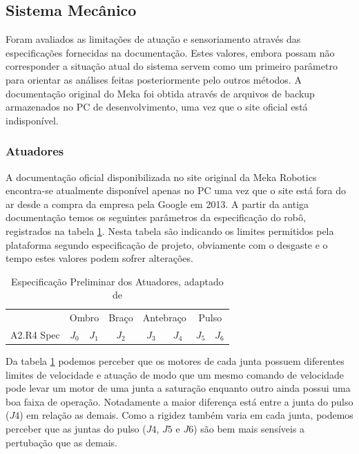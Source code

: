 \subsection{Sistema Mecânico}

Foram avaliados as limitações de atuação e sensoriamento através das especificações fornecidas na documentação. Estes valores, embora possam não corresponder a situação atual do sistema servem como um primeiro parâmetro para orientar as análises feitas posteriormente pelo outros métodos. A documentação original do Meka foi obtida através de arquivos de backup armazenados no PC de desenvolvimento, uma vez que o site oficial está indisponível.

\subsubsection{Atuadores}

 A documentação oficial disponibilizada no site original da Meka Robotics encontra-se atualmente disponível apenas no PC uma vez que o site está fora do ar desde a compra da empresa pela Google em 2013. A partir da antiga documentação temos os seguintes parâmetros da especificação do robô, registrados na tabela \ref{tab:a2armActuationDoc}. Nesta tabela são indicando os limites permitidos pela plataforma segundo especificação de projeto, obviamente com o desgaste e o tempo estes valores podem sofrer alterações.

\begin{table}[H]
    \centering
    \caption{Especificação Preliminar dos Atuadores, adaptado de \cite{mekaguide}}
    \begin{tabular}{c|ccccccc}
         \hline
         & \multicolumn{2}{c}{Ombro} & Braço & \multicolumn{2}{c}{Antebraço} & \multicolumn{2}{c}{Pulso}\\
         A2.R4 Spec & $J_0$ & $J_1$ & $J_2$ & $J_3$ & $J_4$ & $J_5$ & $J_6$\\
         \hline
         
         \hline
    \end{tabular}
    \label{tab:a2armActuationDoc}
\end{table}

Da tabela \ref{tab:a2armActuationDoc} podemos perceber que os motores de cada junta possuem diferentes limites de velocidade e atuação de modo que um mesmo comando de velocidade pode levar um motor de uma junta a saturação enquanto outro ainda possui uma boa faixa de operação. Notadamente a maior diferença está entre a junta do pulso ($J4$) em relação as demais. Como a rigidez também varia em cada junta, podemos perceber que as juntas do pulso ($J4$, $J5$ e $J6$) são bem mais sensíveis a pertubação que as demais.

